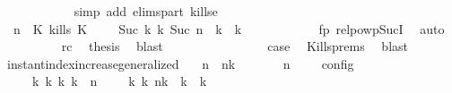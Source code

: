 \begin{isabellebody}
\ \ \ \ \ \ \ \ \ \ \isamarkupfalse%
\ {\isacharparenleft}simp\ add{\isacharcolon}\ elims{\isacharunderscore}part\ kills{\isacharunderscore}e{}{\isacharparenright}\isanewline
\ \ \ \ \ \ \ \ \isamarkupfalse%
\ {\isacartoucheopen}{\isacharparenleft}{\isasymGamma}{\isacharcomma}\ n\ {\isasymturnstile}\ {\isacharparenleft}{\isacharparenleft}K\ kills\ K\ {\isacharhash}\ {\isasymPsi}{\isacharparenright}\ {\isasymtriangleright}\ {\isasymPhi}{\isacharparenright}\ {\isasymhookrightarrow}\isactrlbsup Suc\ k\isactrlesup \ {\isacharparenleft}{\isasymGamma}\isactrlsub k{\isacharcomma}\ Suc\ n\ {\isasymturnstile}\ {\isasymPsi}\isactrlsub k\ {\isasymtriangleright}\ {\isasymPhi}\isactrlsub k{\isacharparenright}{\isacartoucheclose}\isanewline
\ \ \ \ \ \ \ \ \ \ \isamarkupfalse%
\ fp\ relpowp{\isacharunderscore}Suc{\isacharunderscore}I{}\ \isamarkupfalse%
\ auto\isanewline
\ \ \ \ \ \ \ \ \isamarkupfalse%
\ rc\ \isamarkupfalse%
\ {\isacharquery}thesis\ \isamarkupfalse%
\ blast\isanewline
\ \ \ \ \ \ \isamarkupfalse%
\isanewline
\ \ \ \ \ \ \isamarkupfalse%
\ \isamarkupfalse%
\ {\isacharquery}case\ \isamarkupfalse%
\ Kills{\isachardot}prems{\isacharparenleft}{}{\isacharparenright}\ \isamarkupfalse%
\ blast\isanewline
\ \ \isamarkupfalse%
\isanewline
{}\isamarkupfalse%
%
\endisatagproof
{\isafoldproof}%
%
\isadelimproof
\isanewline
%
\endisadelimproof
\isanewline
{}\isamarkupfalse%
\ instant{\isacharunderscore}index{\isacharunderscore}increase{\isacharunderscore}generalized{\isacharcolon}\isanewline
\ \ \ {\isacartoucheopen}n\ {\isacharless}\ n\isactrlsub k{\isacartoucheclose}\isanewline
\ \ \ {\isacartoucheopen}{\isasymrho}\ {\isasymin}\ {\isasymlbrakk}\ {\isasymGamma}{\isacharcomma}\ n\ {\isasymturnstile}\ {\isasymPsi}\ {\isasymtriangleright}\ {\isasymPhi}\ {\isasymrbrakk}\isactrlsub c\isactrlsub o\isactrlsub n\isactrlsub f\isactrlsub i\isactrlsub g{\isacartoucheclose}\isanewline
\ \ \ \ \ {\isacartoucheopen}{\isasymexists}{\isasymGamma}\isactrlsub k\ {\isasymPsi}\isactrlsub k\ {\isasymPhi}\isactrlsub k\ k{\isachardot}\ {\isacharparenleft}{\isacharparenleft}{\isasymGamma}{\isacharcomma}\ n\ {\isasymturnstile}\ {\isasymPsi}\ {\isasymtriangleright}\ {\isasymPhi}{\isacharparenright}\ {\isasymhookrightarrow}\isactrlbsup k\isactrlesup \ {\isacharparenleft}{\isasymGamma}\isactrlsub k{\isacharcomma}\ n\isactrlsub k\ {\isasymturnstile}\ {\isasymPsi}\isactrlsub k\ {\isasymtriangleright}\ {\isasymPhi}\isactrlsub k{\isacharparenright}{\isacharparenright}\isanewline

\end{isabellebody}
